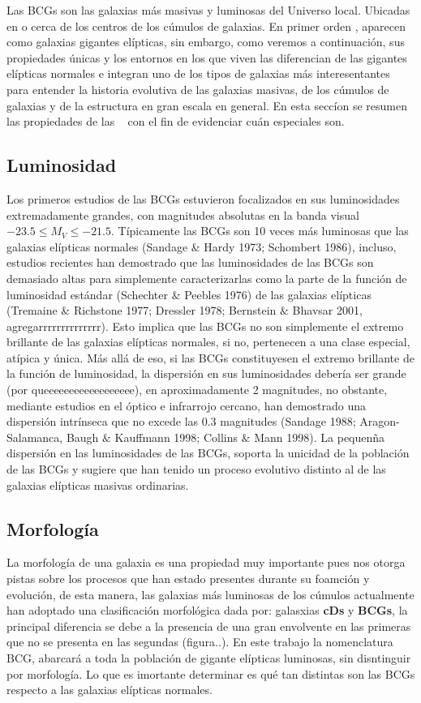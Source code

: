 Las BCGs son las galaxias m\'as masivas y luminosas del Universo local.
Ubicadas en o cerca de los centros de los c\'umulos de galaxias. En primer orden , aparecen como galaxias gigantes el\'ipticas,
sin embargo, como veremos a continuaci\'on, sus propiedades \'unicas y los entornos en los que
viven las diferencian de las gigantes el\'ipticas normales e integran uno de los tipos
de galaxias m\'as interesentantes para entender la historia evolutiva de las galaxias masivas, 
de los c\'umulos de galaxias y de la estructura en gran escala en general.
En esta secc\'ion se resumen las propiedades de las \bcgs~ con el fin de evidenciar
cu\'an especiales son.

\subsection{Luminosidad}
Los primeros estudios de las BCGs estuvieron focalizados en sus luminosidades extremadamente
grandes, con magnitudes absolutas en la banda visual $ -23.5 \leq M_{V} \leq -21.5$. T\'ipicamente
las BCGs son 10 veces m\'as luminosas que las galaxias el\'ipticas normales (Sandage $\&$ Hardy 1973;
Schombert 1986), incluso, estudios recientes han demostrado que las luminosidades de las
BCGs son demasiado altas para simplemente caracterizarlas como la parte de la funci\'on de luminosidad est\'andar
(Schechter $\&$ Peebles 1976) de las galaxias el\'ipticas (Tremaine
$\&$ Richstone 1977; Dressler 1978; Bernstein $\&$ Bhavsar 2001, agregarrrrrrrrrrrrrr). Esto implica que 
las BCGs no son simplemente el extremo brillante de las galaxias el\'ipticas normales, si no, pertenecen 
a una clase especial, at\'ipica  y \'unica.
M\'as all\'a de eso, si las BCGs constituyesen el extremo brillante de la funci\'on de luminosidad, la
dispersi\'on en sus luminosidades deber\'ia ser grande (por queeeeeeeeeeeeeeeeee), en aproximadamente 2 magnitudes,
no obstante, mediante estudios en el \'optico e infrarrojo cercano, han demostrado una dispersi\'on intr\'inseca
que no excede las 0.3 magnitudes (Sandage 1988; Aragon-Salamanca, Baugh $\&$ Kauffmann 1998; Collins $\&$ Mann 1998).
La pequen\~na dispersi\'on en las luminosidades de las BCGs, soporta la unicidad de la poblaci\'on
de las BCGs y sugiere que han tenido un proceso evolutivo distinto al de las galaxias el\'ipticas masivas ordinarias.

\subsection{Morfolog\'ia}
La morfolog\'ia de una galaxia es una propiedad muy importante
pues nos otorga pistas sobre los procesos que han estado presentes
durante su foamci\'on y evoluci\'on, de esta manera, las galaxias
m\'as luminosas de los c\'umulos actualmente han adoptado una clasificaci\'on
morfol\'ogica dada por: galasxias \textbf{cDs} y \textbf{BCGs}, la principal
diferencia se debe a la presencia de una gran envolvente en las primeras
que no se presenta en las segundas (figura..). En este trabajo la nomenclatura BCG, abarcar\'a
a toda la poblaci\'on de gigante el\'ipticas luminosas, sin disntinguir por morfolog\'ia.
Lo que es imortante determinar es qu\'e tan distintas son las BCGs respecto a las
galaxias el\'ipticas normales.

